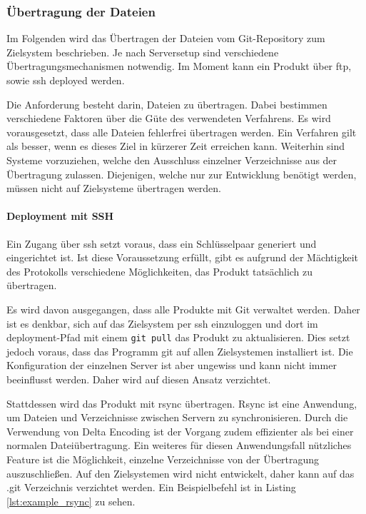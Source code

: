 
\subsubsection{Übertragung der Dateien} %
\label{ssub:uebertragung_der_dateien}

Im Folgenden wird das Übertragen der Dateien vom Git-Repository zum Zielsystem beschrieben. Je nach Serversetup sind verschiedene Übertragungsmechanismen notwendig. Im Moment kann ein Produkt über \gls{ftp}, sowie \gls{ssh} deployed werden.

Die Anforderung besteht darin, Dateien zu übertragen. Dabei bestimmen verschiedene Faktoren über die Güte des verwendeten Verfahrens. Es wird vorausgesetzt, dass alle Dateien fehlerfrei übertragen werden. Ein Verfahren gilt als besser, wenn es dieses Ziel in kürzerer Zeit erreichen kann. Weiterhin sind Systeme vorzuziehen, welche den Ausschluss einzelner Verzeichnisse aus der Übertragung zulassen. Diejenigen, welche nur zur Entwicklung benötigt werden, müssen nicht auf Zielsysteme übertragen werden.

\paragraph{Deployment mit SSH} %
\label{par:deployment_mit_ssh}

Ein Zugang über \gls{ssh} setzt voraus, dass ein Schlüsselpaar generiert und eingerichtet ist. Ist diese Voraussetzung erfüllt, gibt es aufgrund der Mächtigkeit des Protokolls verschiedene Möglichkeiten, das Produkt tatsächlich zu übertragen.

Es wird davon ausgegangen, dass alle Produkte mit Git verwaltet werden. Daher ist es denkbar, sich auf das Zielsystem per \gls{ssh} einzuloggen und dort im \Gls{deployment}-Pfad mit einem \lstinline!git pull! das Produkt zu aktualisieren. Dies setzt jedoch voraus, dass das Programm git auf allen Zielsystemen installiert ist. Die Konfiguration der einzelnen Server ist aber ungewiss und kann nicht immer beeinflusst werden. Daher wird auf diesen Ansatz verzichtet.

Stattdessen wird das Produkt mit \gls{rsync} übertragen. Rsync ist eine Anwendung, um Dateien und Verzeichnisse zwischen Servern zu synchronisieren. Durch die Verwendung von Delta Encoding ist der Vorgang zudem effizienter als bei einer normalen Dateiübertragung. Ein weiteres für diesen Anwendungsfall nützliches Feature ist die Möglichkeit, einzelne Verzeichnisse von der Übertragung auszuschließen. Auf den Zielsystemen wird nicht entwickelt, daher kann auf das .git Verzeichnis verzichtet werden. Ein Beispielbefehl ist in Listing \ref{lst:example_rsync} zu sehen.

